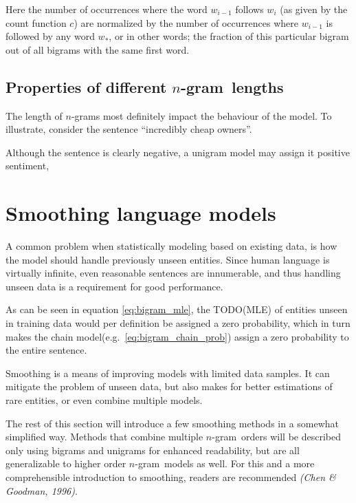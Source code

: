 \documentclass[a4paper,11pt]{kth-mag}
\newcommand{\ngram}{$n$-gram}
\newcommand{\gls}[1]{TODO(#1)}
\begin{document}
Here the number of occurrences where the word $w_{i-1}$ follows $w_i$
(as given by the count function $c$) are normalized by the number of occurrences where $w_{i-1}$
is followed by any word $w_*$, or in other words; the fraction of this particular bigram
out of all bigrams with the same first word.

%




\subsection{Properties of different \ngram~lengths}

The length of \ngram s most definitely impact the behaviour of the model.
To illustrate, consider the sentence ``incredibly cheap owners''.

Although the sentence is clearly negative, a unigram model may assign it positive sentiment,

\section{Smoothing language models}
A common problem when statistically modeling based on existing data,
is how the model should handle previously unseen entities.
Since human language is virtually infinite, even reasonable sentences are innumerable,
and thus handling unseen data is a requirement for good performance.

As can be seen in equation \ref{eq:bigram_mle}, the \gls{MLE} of entities unseen in
training data would per definition be assigned a zero probability, which in turn makes
the chain model(e.g.~\ref{eq:bigram_chain_prob}) assign a zero probability to the entire
sentence\cite{chen_goodman}.

Smoothing is a means of improving models with limited data samples.
It can mitigate the problem of unseen data,
but also makes for better estimations of rare entities, or even combine multiple models.

The rest of this section will introduce a few smoothing methods in a somewhat simplified way.
Methods that combine multiple \ngram~orders will be described only using bigrams and
unigrams for enhanced readability,
but are all generalizable to higher order \ngram~models as well.
For this and a more comprehensible introduction to smoothing,
readers are recommended \emph{(Chen \& Goodman, 1996)}.
\end{document}
